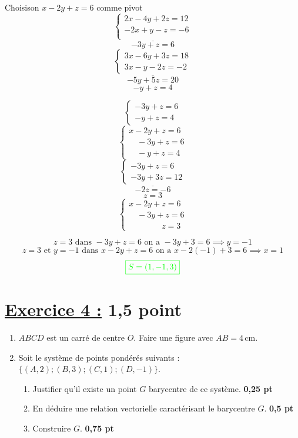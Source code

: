 \documentclass[12pt,a4paper]{article}
\begin{document}
\begin{enumerate}
Choisison $x - 2y + z = 6$ comme pivot 
    \[
\underline{    \begin{cases}
        2x - 4y + 2z = 12 \\
        -2x + y - z = -6 \\
    \end{cases}}
    \]
    \[-3y+z=6\]
    \[
\underline{    \begin{cases}
        3x - 6y + 3z = 18 \\
        3x - y - 2z = -2 
    \end{cases}}
    \]
    \[-5y+5z=20\]
    \[-y+z=4\]

    \[
\begin{cases}
        -3y+z=6 \\
        -y+z=4
    \end{cases}
    \]
        \[
    \begin{cases}
        x - 2y + z = 6 \\
        \quad -3y+z=6 \\
        \quad -y+z=4
    \end{cases}
    \]
    \[
\underline{    \begin{cases}
        -3y+z=6 \\
        -3y+3z=12
    \end{cases}}
    \]
    \[-2z=-6\]
    \[z=3\]
    \[
    \begin{cases}
        x - 2y + z = 6 \\
        \quad -3y+z=6 \\
        \quad\quad\quad\quad z=3
    \end{cases}
    \]
    
    \[z=3 \text{ dans } -3y+z=6  \text{ on a } -3y+3=6 \implies y=-1\]
    \[\text{$z=3 $ et $y=-1$ dans } x - 2y + z = 6  \text{ on a } x - 2(-1) + 3 = 6 \implies x=1\]
\[
\textcolor{green}{\boxed{S = (1,-1,3)   }} 
\]
\end{enumerate}
\section*{\underline{Exercice 4 :} 1,5 point}

\begin{enumerate}
    \item $ABCD$ est un carré de centre $O$. Faire une figure avec $AB = 4 \, \text{cm}$.
    
    \item Soit le système de points pondérés suivants : $\{(A, 2); (B, 3); (C, 1); (D, -1)\}$.
    \begin{enumerate}
        \item Justifier qu’il existe un point $G$ barycentre de ce système. \hfill \textbf{0,25 pt}
        
        \item En déduire une relation vectorielle caractérisant le barycentre $G$. \hfill \textbf{0,5 pt}
   
        \item Construire $G$. \hfill \textbf{0,75 pt}
    \end{enumerate}
\end{enumerate}
\end{document}
